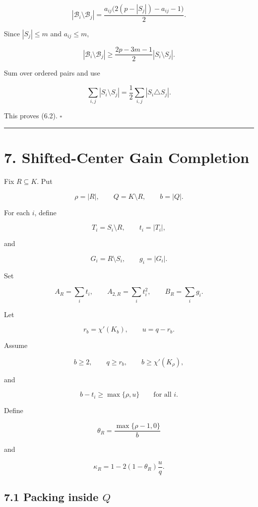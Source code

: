 \documentclass[english,11pt,a4paper]{article}
\begin{document}
\[
|\mathcal B_i\setminus\mathcal B_j|
=
\frac{a_{ij}\bigl(2(p-|S_j|)-a_{ij}-1\bigr)}2.
\]

Since \(|S_j|\le m\) and \(a_{ij}\le m\),

\[
|\mathcal B_i\setminus\mathcal B_j|
\ge
\frac{2p-3m-1}{2}|S_i\setminus S_j|.
\]

Sum over ordered pairs and use

\[
\sum_{i,j}|S_i\setminus S_j|
=
\frac12\sum_{i,j}|S_i\triangle S_j|.
\]

This proves (6.2). \(\square\)

\begin{center}\rule{0.5\linewidth}{0.5pt}\end{center}

\section{7. Shifted-Center Gain
Completion}\label{shifted-center-gain-completion}

Fix \(R\subseteq K\). Put

\[
\rho=|R|,
\qquad
Q=K\setminus R,
\qquad
b=|Q|.
\]

For each \(i\), define

\[
T_i=S_i\setminus R,
\qquad
t_i=|T_i|,
\]

and

\[
G_i=R\setminus S_i,
\qquad
g_i=|G_i|.
\]

Set

\[
A_R=\sum_i t_i,
\qquad
A_{2,R}=\sum_i t_i^2,
\qquad
B_R=\sum_i g_i.
\]

Let

\[
r_b=\chi'(K_b),
\qquad
u=q-r_b.
\]

Assume

\[
b\ge2,
\qquad
q\ge r_b,
\qquad
b\ge\chi'(K_\rho),
\tag{7.1}
\]

and

\[
b-t_i\ge\max\{\rho,u\}
\qquad
\text{for all }i.
\tag{7.2}
\]

Define

\[
\theta_R=\frac{\max\{\rho-1,0\}}{b}
\]

and

\[
\kappa_R
=
1-2(1-\theta_R)\frac{u}{q}.
\tag{7.3}
\]

\subsection{\texorpdfstring{7.1 Packing inside
\(Q\)}{7.1 Packing inside Q}}\label{packing-inside-q}
\end{document}
